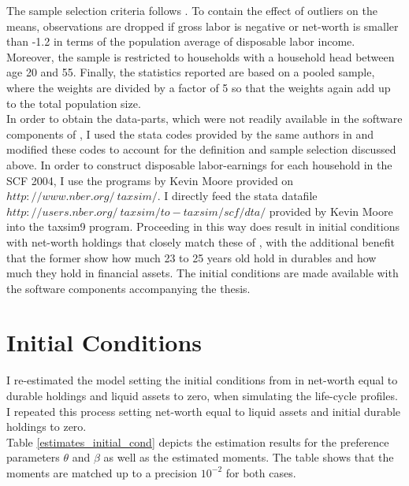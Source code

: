 \documentclass[a4paper,12pt,legno]{article}
\begin{document}
The sample selection criteria follows \cite{hintermaier2011}. To contain the effect of outliers on the means, observations are dropped if gross labor is negative or net-worth is smaller than -1.2 in terms of the population average of disposable labor income. Moreover, the sample is restricted to households with a household head between age 20 and 55. 
Finally, the statistics reported are based on a pooled sample, where the weights are divided by a factor of 5 so that the weights again add up to the total population size. \\
In order to obtain the data-parts, which were not readily available in the software components of \cite{hintermaier2011}, I used the stata codes provided by the same authors in \cite{hintermaier2016} and modified these codes to account for the definition and sample selection discussed above. In order to construct disposable labor-earnings for each household in the SCF 2004, I use the programs by Kevin Moore provided on $http://www.nber.org/~taxsim/$.  I directly feed the stata  datafile $http://users.nber.org/~taxsim/to-taxsim/scf/dta/$ provided by Kevin Moore into the taxsim9 program. Proceeding in this way does result in initial conditions with net-worth holdings that closely match these of \cite{hintermaier2011}, with the additional benefit that the former show how much 23 to 25 years old hold in durables and how much they hold in financial assets. The initial conditions are made available with the software components accompanying the thesis.


\section{Initial Conditions}
\label{initial_conditions}

I re-estimated the model setting the initial conditions from \cite{hintermaier2011} in net-worth equal to durable holdings and liquid assets to zero, when simulating the life-cycle profiles. I repeated this process setting net-worth equal to liquid assets and initial durable holdings to zero.\\
Table \ref{estimates_initial_cond} depicts the estimation results for the preference parameters $\theta$ and $\beta$ as well as the estimated moments. The table shows that the moments are matched up to a precision $10^{-2}$ for both cases. 
\end{document}
